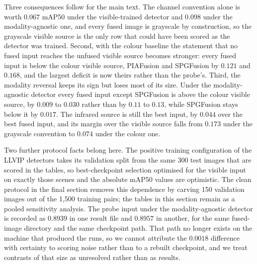 \documentclass[10pt,a4paper]{article}
\begin{document}
Three consequences follow for the main text. The channel convention alone is worth
$0.067$ mAP50 under the visible-trained detector and $0.098$ under the
modality-agnostic one, and every fused image is grayscale by construction, so the
grayscale visible source is the only row that could have been scored as the detector
was trained. Second, with the colour baseline the statement that no fused input
reaches the unfused visible source becomes stronger: every fused input is below the
colour visible source, PIAFusion and SPGFusion by $0.121$ and $0.168$, and the
largest deficit is now theirs rather than the probe's. Third, the modality reversal
keeps its sign but loses most of its size. Under the modality-agnostic detector every
fused input except SPGFusion is above the colour visible source, by $0.009$ to
$0.030$ rather than by $0.11$ to $0.13$, while SPGFusion stays below it by $0.017$.
The infrared source is still the best input, by $0.044$ over the best fused input,
and its margin over the visible source falls from $0.173$ under the grayscale
convention to $0.074$ under the colour one.

Two further protocol facts belong here. The positive training configuration of the
LLVIP detectors takes its validation split from the
same 300 test images that are scored in the tables, so best-checkpoint selection
optimised for the visible input on exactly those scenes and the absolute mAP50 values
are optimistic. The clean protocol in the final section removes this dependence by
carving 150 validation images out of the 1,500 training pairs; the tables in this
section remain as a pooled sensitivity analysis. The probe input under the
modality-agnostic detector is recorded
as $0.8939$ in one result file and $0.8957$ in another, for the same fused-image
directory and the same checkpoint path. That path no longer exists on the machine
that produced the runs, so we cannot attribute the $0.0018$ difference with certainty
to scoring noise rather than to a rebuilt checkpoint, and we treat contrasts of that
size as unresolved rather than as results.
\end{document}

